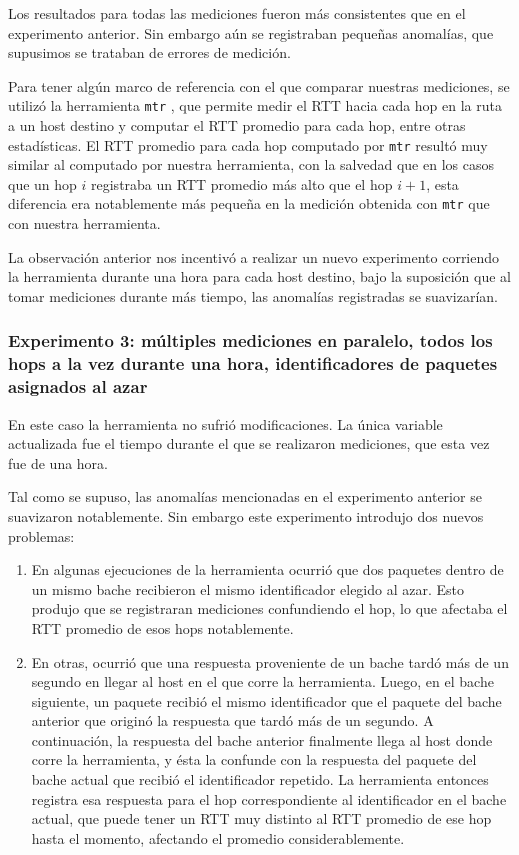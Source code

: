 \documentclass[a4paper, 10pt, twoside]{article}
\begin{document}
Los resultados para todas las mediciones fueron más consistentes que en el experimento anterior. Sin embargo aún se registraban pequeñas anomalías, que supusimos se trataban de errores de medición.

Para tener algún marco de referencia con el que comparar nuestras mediciones, se utilizó la herramienta \texttt{mtr} \cite{mtr}, que permite medir el RTT hacia cada hop en la ruta a un host destino y computar el RTT promedio para cada hop, entre otras estadísticas. El RTT promedio para cada hop computado por \texttt{mtr} resultó muy similar al computado por nuestra herramienta, con la salvedad que en los casos que un hop $i$ registraba un RTT promedio más alto que el hop $i + 1$, esta diferencia era notablemente más pequeña en la medición obtenida con \texttt{mtr} que con nuestra herramienta.

La observación anterior nos incentivó a realizar un nuevo experimento corriendo la herramienta durante una hora para cada host destino, bajo la suposición que al tomar mediciones durante más tiempo, las anomalías registradas se suavizarían.


\subsubsection{Experimento 3: múltiples mediciones en paralelo, todos los hops a la vez durante una hora, identificadores de paquetes asignados al azar}

En este caso la herramienta no sufrió modificaciones. La única variable actualizada fue el tiempo durante el que se realizaron mediciones, que esta vez fue de una hora.

Tal como se supuso, las anomalías mencionadas en el experimento anterior se suavizaron notablemente. Sin embargo este experimento introdujo dos nuevos problemas:

\begin{enumerate}
  \item En algunas ejecuciones de la herramienta ocurrió que dos paquetes dentro de un mismo bache recibieron el mismo identificador elegido al azar. Esto produjo que se registraran mediciones confundiendo el hop, lo que afectaba el RTT promedio de esos hops notablemente.

  \item En otras, ocurrió que una respuesta proveniente de un bache tardó más de un segundo en llegar al host en el que corre la herramienta. Luego, en el bache siguiente, un paquete recibió el mismo identificador que el paquete del bache anterior que originó la respuesta que tardó más de un segundo. A continuación, la respuesta del bache anterior finalmente llega al host donde corre la herramienta, y ésta la confunde con la respuesta del paquete del bache actual que recibió el identificador repetido. La herramienta entonces registra esa respuesta para el hop correspondiente al identificador en el bache actual, que puede tener un RTT muy distinto al RTT promedio de ese hop hasta el momento, afectando el promedio considerablemente.
\end{enumerate}
\end{document}
